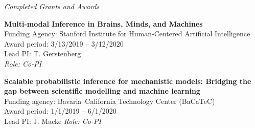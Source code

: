 \documentclass[10pt]{article}
\renewcommand{\section}[1]{\pagebreak[3]%
    \hyphenpenalty=10000%
    \vspace{1.3\baselineskip}%
    \noindent\llap{\scshape\smash{\parbox[t]{\marginparwidth}{\raggedright #1}}}%
    \vspace{-\baselineskip}\par}
\begin{document}
\vspace{1em}

\textit{Completed Grants and Awards}

\begin{outerlist}
\item \textbf{Multi-modal Inference in Brains, Minds, and Machines} \\
  Funding Agency: Stanford Institute for Human-Centered Artificial Intelligence \\
  Award period: 3/13/2019 -- 3/12/2020 \\
  Lead PI: T. Gerstenberg \\
  \textit{Role: Co-PI}

\item \textbf{Scalable probabilistic inference for mechanistic models: Bridging the
    gap between scientific modelling and machine learning} \\
  Funding agency: Bavaria--California Technology Center (BaCaTeC)\\
  Award period: 1/1/2019 -- 6/1/2020 \\
  Lead PI: J. Macke
  \textit{Role: Co-PI}

\end{outerlist}




\end{document}
